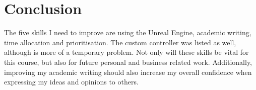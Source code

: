 \documentclass{scrartcl}
\begin{document}
\section{Conclusion}
The five skills I need to improve are using the Unreal Engine, academic writing, time allocation and prioritisation. The custom controller was listed as well, although is more of a temporary problem. Not only will these skills be vital for this course, but also for future personal and business related work. Additionally, improving my academic writing should also increase my overall confidence when expressing my ideas and opinions to others.
\end{document}
